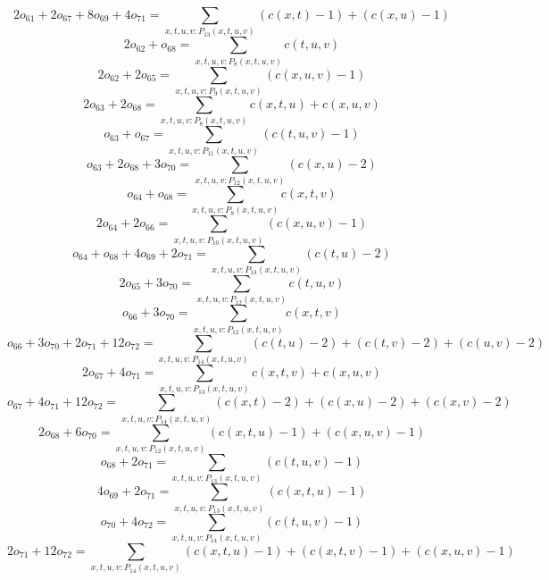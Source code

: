 \[2o_{61} + 2o_{67} + 8o_{69} + 4o_{71} = \sum\limits_{x,t,u,v:P_{13} (x,t,u,v)} ( c( x, t ) - 1 ) + ( c( x, u ) - 1 ) \]
\[2o_{62} + o_{68} = \sum\limits_{x,t,u,v:P_{8} (x,t,u,v)} c( t, u, v ) \]
\[2o_{62} + 2o_{65} = \sum\limits_{x,t,u,v:P_{9} (x,t,u,v)} ( c( x, u, v ) - 1 ) \]
\[2o_{63} + 2o_{68} = \sum\limits_{x,t,u,v:P_{8} (x,t,u,v)} c( x, t, u ) + c( x, u, v ) \]
\[o_{63} + o_{67} = \sum\limits_{x,t,u,v:P_{11} (x,t,u,v)} ( c( t, u, v ) - 1 ) \]
\[o_{63} + 2o_{68} + 3o_{70} = \sum\limits_{x,t,u,v:P_{12} (x,t,u,v)} ( c( x, u ) - 2 ) \]
\[o_{64} + o_{68} = \sum\limits_{x,t,u,v:P_{8} (x,t,u,v)} c( x, t, v ) \]
\[2o_{64} + 2o_{66} = \sum\limits_{x,t,u,v:P_{10} (x,t,u,v)} ( c( x, u, v ) - 1 ) \]
\[o_{64} + o_{68} + 4o_{69} + 2o_{71} = \sum\limits_{x,t,u,v:P_{13} (x,t,u,v)} ( c( t, u ) - 2 ) \]
\[2o_{65} + 3o_{70} = \sum\limits_{x,t,u,v:P_{12} (x,t,u,v)} c( t, u, v ) \]
\[o_{66} + 3o_{70} = \sum\limits_{x,t,u,v:P_{12} (x,t,u,v)} c( x, t, v ) \]
\[o_{66} + 3o_{70} + 2o_{71} + 12o_{72} = \sum\limits_{x,t,u,v:P_{14} (x,t,u,v)} ( c( t, u ) - 2 ) + ( c( t, v ) - 2 ) + ( c( u, v ) - 2 ) \]
\[2o_{67} + 4o_{71} = \sum\limits_{x,t,u,v:P_{13} (x,t,u,v)} c( x, t, v ) + c( x, u, v ) \]
\[o_{67} + 4o_{71} + 12o_{72} = \sum\limits_{x,t,u,v:P_{14} (x,t,u,v)} ( c( x, t ) - 2 ) + ( c( x, u ) - 2 ) + ( c( x, v ) - 2 ) \]
\[2o_{68} + 6o_{70} = \sum\limits_{x,t,u,v:P_{12} (x,t,u,v)} ( c( x, t, u ) - 1 ) + ( c( x, u, v ) - 1 ) \]
\[o_{68} + 2o_{71} = \sum\limits_{x,t,u,v:P_{13} (x,t,u,v)} ( c( t, u, v ) - 1 ) \]
\[4o_{69} + 2o_{71} = \sum\limits_{x,t,u,v:P_{13} (x,t,u,v)} ( c( x, t, u ) - 1 ) \]
\[o_{70} + 4o_{72} = \sum\limits_{x,t,u,v:P_{14} (x,t,u,v)} ( c( t, u, v ) - 1 ) \]
\[2o_{71} + 12o_{72} = \sum\limits_{x,t,u,v:P_{14} (x,t,u,v)} ( c( x, t, u ) - 1 ) + ( c( x, t, v ) - 1 ) + ( c( x, u, v ) - 1 ) \]

